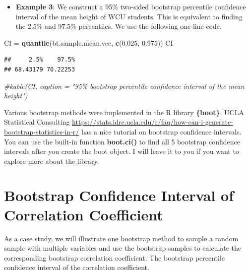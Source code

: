 \documentclass[
]{book}
\newenvironment{Shaded}{\begin{snugshade}}{\end{snugshade}}
\newcommand{\CommentTok}[1]{\textcolor[rgb]{0.56,0.35,0.01}{\textit{#1}}}
\newcommand{\FloatTok}[1]{\textcolor[rgb]{0.00,0.00,0.81}{#1}}
\newcommand{\FunctionTok}[1]{\textcolor[rgb]{0.13,0.29,0.53}{\textbf{#1}}}
\newcommand{\NormalTok}[1]{#1}
\newcommand{\OtherTok}[1]{\textcolor[rgb]{0.56,0.35,0.01}{#1}}
\providecommand{\tightlist}{%
  \setlength{\itemsep}{0pt}\setlength{\parskip}{0pt}}
\begin{document}
\begin{itemize}
\tightlist
\item
  \textbf{Example 3}: We construct a 95\% two-sided bootstrap percentile confidence interval of the mean height of WCU students. This is equivalent to finding the 2.5\% and 97.5\% percentiles. We use the following one-line code.
\end{itemize}

\begin{Shaded}
\begin{Highlighting}[]
\NormalTok{CI }\OtherTok{=} \FunctionTok{quantile}\NormalTok{(bt.sample.mean.vec, }\FunctionTok{c}\NormalTok{(}\FloatTok{0.025}\NormalTok{, }\FloatTok{0.975}\NormalTok{))}
\NormalTok{CI}
\end{Highlighting}
\end{Shaded}

\begin{verbatim}
##     2.5%    97.5% 
## 68.43179 70.22253
\end{verbatim}

\begin{Shaded}
\begin{Highlighting}[]
\CommentTok{\#kable(CI, caption = "95\% bootstrap percentile confidence interval of the mean height")}
\end{Highlighting}
\end{Shaded}

Various bootstrap methods were implemented in the R library \textbf{\{boot\}}. UCLA Statistical Consulting \url{https://stats.idre.ucla.edu/r/faq/how-can-i-generate-bootstrap-statistics-in-r/} has a nice tutorial on bootstrap confidence intervals. You can use the built-in function \textbf{boot.ci()} to find all 5 bootstrap confidence intervals after you create the boot object. I will leave it to you if you want to explore more about the library.

\hypertarget{bootstrap-confidence-interval-of-correlation-coefficient}{%
\section{Bootstrap Confidence Interval of Correlation Coefficient}\label{bootstrap-confidence-interval-of-correlation-coefficient}}

As a case study, we will illustrate one bootstrap method to sample a random sample with multiple variables and use the bootstrap samples to calculate the corresponding bootstrap correlation coefficient. The bootstrap percentile confidence interval of the correlation coefficient.
\end{document}
